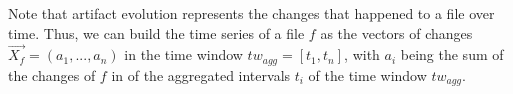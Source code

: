 %


%
%
%

Note that artifact evolution represents the changes that happened to a file over time. Thus, we can build the time series of a file $f$ as the vectors of changes $\vec{X_{f}} = (a_1, ..., a_n)$ in the time window $tw_{agg} = [t_1,t_n]$, with $a_i$ being the sum of the changes of $f$ in of the aggregated intervals $t_i$ of the time window $tw_{agg}$.


